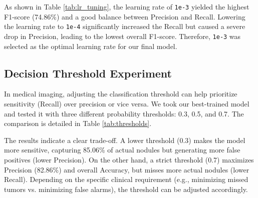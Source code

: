 \documentclass{IEEEtran}
\begin{document}
As shown in Table \ref{tab:lr_tuning}, the learning rate of \texttt{1e-3} yielded the highest F1-score (74.86\%) and a good balance between Precision and Recall. Lowering the learning rate to \texttt{1e-4} significantly increased the Recall but caused a severe drop in Precision, leading to the lowest overall F1-score. Therefore, \texttt{1e-3} was selected as the optimal learning rate for our final model.

\subsection{Decision Threshold Experiment}
In medical imaging, adjusting the classification threshold can help prioritize sensitivity (Recall) over precision or vice versa. We took our best-trained model and tested it with three different probability thresholds: 0.3, 0.5, and 0.7. The comparison is detailed in Table \ref{tab:thresholds}.

\begin{table}[h]
    \centering
    \caption{Impact of different probability thresholds on the best model's predictions.}
    \label{tab:thresholds}
\end{table}

The results indicate a clear trade-off. A lower threshold (0.3) makes the model more sensitive, capturing 85.06\% of actual nodules but generating more false positives (lower Precision). On the other hand, a strict threshold (0.7) maximizes Precision (82.86\%) and overall Accuracy, but misses more actual nodules (lower Recall). Depending on the specific clinical requirement (e.g., minimizing missed tumors vs. minimizing false alarms), the threshold can be adjusted accordingly.
\end{document}
